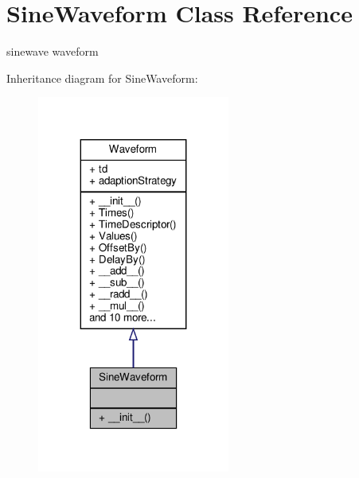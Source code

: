 \hypertarget{classSignalIntegrity_1_1TimeDomain_1_1Waveform_1_1SineWaveform_1_1SineWaveform}{}\section{Sine\+Waveform Class Reference}
\label{classSignalIntegrity_1_1TimeDomain_1_1Waveform_1_1SineWaveform_1_1SineWaveform}


sinewave waveform  




Inheritance diagram for Sine\+Waveform\+:\nopagebreak
\begin{figure}[H]
\begin{center}
\leavevmode
\includegraphics[width=179pt]{classSignalIntegrity_1_1TimeDomain_1_1Waveform_1_1SineWaveform_1_1SineWaveform__inherit__graph}
\end{center}
\end{figure}


